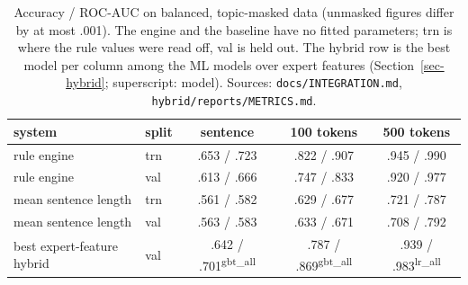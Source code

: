 \begin{table}[tbp]
\centering\small
\caption{Accuracy / ROC-AUC on balanced, topic-masked data (unmasked figures differ by at most
.001). The engine and the baseline have no fitted parameters; trn is where the rule values were
read off, val is held out. The hybrid row is the best model per column among the ML models over
expert features (Section~\ref{sec-hybrid}; superscript: model). Sources: \texttt{docs/INTEGRATION.md},
\texttt{hybrid/reports/METRICS.md}.}
\label{tab-results}
\begin{tabular}{@{}l l c c c@{}}
\toprule
system & split & sentence & 100 tokens & 500 tokens \\
\midrule
rule engine & trn & .653 / .723 & .822 / .907 & .945 / .990 \\
rule engine & val & .613 / .666 & .747 / .833 & .920 / .977 \\
mean sentence length & trn & .561 / .582 & .629 / .677 & .721 / .787 \\
mean sentence length & val & .563 / .583 & .633 / .671 & .708 / .792 \\
best expert-feature hybrid & val & .642 / .701\textsuperscript{gbt\_all} & .787 / .869\textsuperscript{gbt\_all} & .939 / .983\textsuperscript{lr\_all} \\
\bottomrule
\end{tabular}
\end{table}
